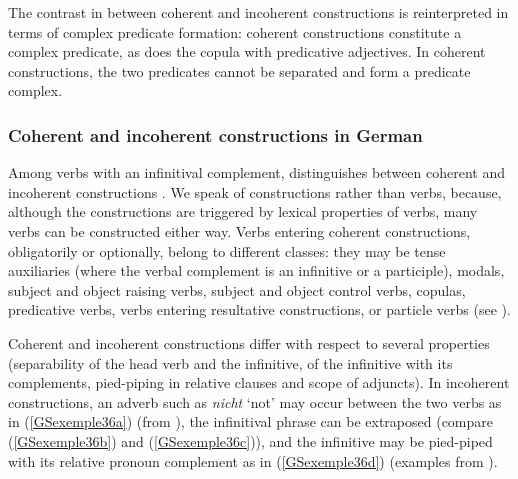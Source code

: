 The contrast in  between coherent and incoherent constructions is reinterpreted in terms
of complex predicate formation: coherent constructions constitute a complex predicate, as does the
copula with predicative adjectives. In coherent constructions, the two
predicates cannot be separated and form a predicate complex. 

\subsubsection{Coherent and incoherent constructions in German}\label{GSsection4.1.1}

\largerpage[2]
Among verbs with an infinitival complement,  distinguishes between coherent and
incoherent constructions \citep{gunnar1955studien}. We speak of constructions rather than verbs,
because, although the constructions are triggered by lexical properties of verbs, many verbs can be
constructed either way. Verbs entering coherent constructions, obligatorily or optionally, belong to
different classes: they may be tense auxiliaries (where the verbal complement is an infinitive or a
participle), modals, subject and object raising verbs, subject and object control verbs, copulas,
predicative verbs, verbs entering resultative constructions, or particle verbs (see
\citealt[Chapters~2, 5 and~6]{Mueller2002b}).

Coherent and incoherent constructions differ with respect to several properties (separability of the
head verb and the infinitive,  of the infinitive with its complements, pied-piping in
relative clauses and scope of adjuncts). In incoherent constructions, an adverb such as \emph{nicht}
`not' may occur between the two verbs as in (\ref{GSexemple36a}) (from \citealt[42]{Mueller2002b}),
the infinitival phrase can be extraposed (compare (\ref{GSexemple36b}) and (\ref{GSexemple36c})),
and the infinitive may be pied-piped with its relative pronoun complement as in (\ref{GSexemple36d})
(examples from \citealt[117--118]{HN98a}).

\eal
	\label{GSexemple36} 
	\label{GSexemple36a}

    \label{GSexemple36b}

